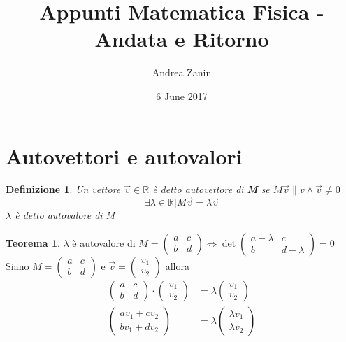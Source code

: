 \documentclass[10pt,a4paper]{article}
\author{Andrea Zanin}
\title{Appunti Matematica Fisica - Andata e Ritorno}
\date{6 June 2017}
\theoremstyle{plain}
\newtheorem{definizione}[subsection]{Definizione}
\theoremstyle{definition}
\newtheorem{teorema}[subsection]{Teorema}
\begin{document}
	\maketitle
\section{Autovettori e autovalori}
\begin{definizione}
	Un vettore $\vec{v} \in \mathbb{R}$ è detto autovettore di \textbf{M} se $M\vec{v}\parallel{v}\land\vec{v}\ne 0$ \\
	\[\exists \lambda \in \mathbb{R} \vert M\vec{v}=\lambda\vec{v}\]
	$\lambda$ è detto autovalore di M
\end{definizione}
\begin{teorema}$\lambda$ è autovalore di $M=\begin{pmatrix}
	a & c \\ b & d
	\end{pmatrix} \Leftrightarrow \det{\begin{pmatrix}
		a-\lambda & c \\ b & d-\lambda
		\end{pmatrix}}=0$ \\
Siano $
M=\begin{pmatrix}
a & c \\ b & d
\end{pmatrix}
$ e $\vec{v}=
\begin{pmatrix}
v_1 \\ v_2
\end{pmatrix}$ allora
\begin{align*}
	\begin{pmatrix}
	a & c \\ b & d
	\end{pmatrix}
	\cdot
	\begin{pmatrix}
	v_1 \\ v_2
	\end{pmatrix}
	&=
	\lambda
	\begin{pmatrix}
		v_1 \\ v_2
	\end{pmatrix}
	\\
	\begin{pmatrix}
	av_1 + cv_2 \\ bv_1 + dv_2
	\end{pmatrix}
	&=
	\lambda
	\begin{pmatrix}
	\lambda v_1 \\ \lambda v_2
	\end{pmatrix}
	\\

\end{align*}
\end{teorema}
\end{document}
